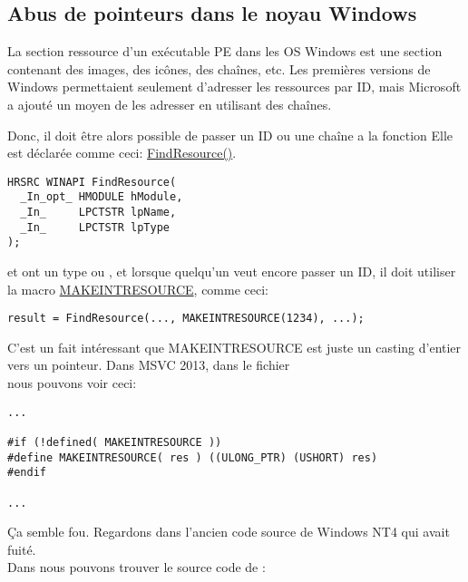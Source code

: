 \subsection{Abus de pointeurs dans le noyau Windows}

La section ressource d'un exécutable PE dans les OS Windows est une section contenant
des images, des icônes, des chaînes, etc.
Les premières versions de Windows permettaient seulement d'adresser les ressources
par ID, mais Microsoft a ajouté un moyen de les adresser en utilisant des chaînes.

Donc, il doit être alors possible de passer un ID ou une chaîne a la fonction
Elle est déclarée comme ceci:
\href{https://msdn.microsoft.com/en-us/library/windows/desktop/ms648042i\%28v=vs.85\%29.aspx}{FindResource()}.


\begin{lstlisting}[style=customc]
HRSRC WINAPI FindResource(
  _In_opt_ HMODULE hModule,
  _In_     LPCTSTR lpName,
  _In_     LPCTSTR lpType
);
\end{lstlisting}

 et  ont un type  ou , et lorsque quelqu'un 
veut encore passer un ID, il doit utiliser la macro
\href{https://msdn.microsoft.com/en-us/library/windows/desktop/ms648029\%28v=vs.85\%29.aspx}{MAKEINTRESOURCE},
comme ceci:


\begin{lstlisting}[style=customc]
result = FindResource(..., MAKEINTRESOURCE(1234), ...);
\end{lstlisting}

C'est un fait intéressant que MAKEINTRESOURCE est juste un casting d'entier vers un pointeur.
Dans MSVC 2013, dans le fichier\\
nous pouvons voir ceci:

\begin{lstlisting}[style=customc]
...

#if (!defined( MAKEINTRESOURCE )) 
#define MAKEINTRESOURCE( res ) ((ULONG_PTR) (USHORT) res)
#endif

...
\end{lstlisting}

Ça semble fou. Regardons dans l'ancien code source de Windows NT4 qui avait fuité.\\
Dans  nous pouvons trouver le source code
de :

